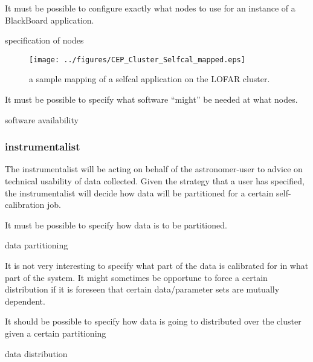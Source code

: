 \documentclass[]{lofar}
\begin{document}
        \begin{requirement}
          It must be possible to configure exactly what nodes to use
          for an instance of a BlackBoard application.
          \caption{specification of nodes\label{req:specification-of-nodes}}
        \end{requirement}

        \begin{figure}
          \texttt{[image: ../figures/CEP\_Cluster\_Selfcal\_mapped.eps]}
          \hypertarget{fig:selfcalMapped}{}
          \caption{a sample mapping of a selfcal application on the
          LOFAR cluster.\label{fig:selfcalMapped}}
        \end{figure}

        \begin{prerequisite}
          It must be possible to specify what software ``might'' be
          needed at what nodes.
          \caption{software availability\label{pre:software-availability}}
        \end{prerequisite}

      \subsubsection{instrumentalist}

        The instrumentalist will be acting on behalf of the
        astronomer-user to advice on technical usability of data
        collected. Given the strategy that a user has specified, the
        instrumentalist will decide how data will be partitioned for a
        certain self-calibration job.

        \begin{requirement}
          It must be possible to specify how data is to be partitioned.
          \caption{data partitioning\label{req:data-partitioning}}
        \end{requirement}

        It is not very interesting to specify what part of the data is
        calibrated for in what part of the system. It might sometimes
        be opportune to force a certain distribution if it is foreseen
        that certain data/parameter sets are mutually dependent.

        \begin{requirement}
          It should be possible to specify how data is going to
          distributed over the cluster given a certain partitioning
          \caption{data distribution\label{req:data-distribution}}
        \end{requirement}
\end{document}
